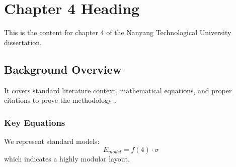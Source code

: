 \chapter{Chapter 4 Heading}
\label{ch:chapter4}
This is the content for chapter 4 of the Nanyang Technological University dissertation.

\section{Background Overview}
It covers standard literature context, mathematical equations, and proper citations to prove the methodology \cite{texbook}.

\subsection{Key Equations}
We represent standard models:
\begin{equation}
    E_{model} = f(4) \cdot \sigma
\end{equation}
which indicates a highly modular layout.
